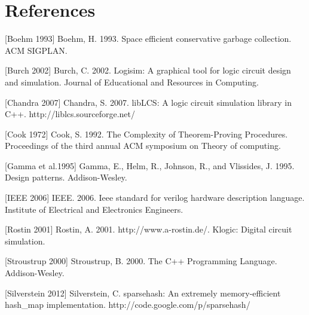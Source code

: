 \documentclass{article}
\begin{document}
\section{References}

[Boehm 1993] Boehm, H. 1993. Space efficient conservative garbage collection. ACM SIGPLAN.

[Burch 2002] Burch, C. 2002. Logisim: A graphical tool for logic circuit design and simulation. Journal of Educational and Resources in Computing.

[Chandra 2007] Chandra, S. 2007. libLCS: A logic circuit simulation library in C++. http://liblcs.sourceforge.net/

[Cook 1972] Cook, S. 1992. The Complexity of Theorem-Proving Procedures. Proceedings of the third annual ACM symposium on Theory of computing.

[Gamma et al.1995] Gamma, E., Helm, R., Johnson, R., and Vlissides, J. 1995. Design patterns. Addison-Wesley.

[IEEE 2006] IEEE. 2006. Ieee standard for verilog hardware description language. Institute of Electrical and Electronics Engineers.

[Rostin 2001] Rostin, A. 2001. http://www.a-rostin.de/. Klogic: Digital circuit simulation.

[Stroustrup 2000] Stroustrup, B. 2000. The C++ Programming Language. Addison-Wesley.

[Silverstein 2012] Silverstein, C. sparsehash: An extremely memory-efficient hash\_map implementation. http://code.google.com/p/sparsehash/
\end{document}
